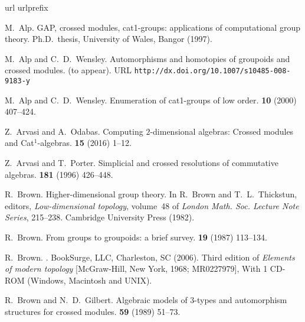 
\begin{thebibliography}{notes}

\expandafter\ifx\csname url\endcsname\relax
  \def\url#1{{\tt #1}}\fi
\expandafter\ifx\csname urlprefix\endcsname\relax\def\urlprefix{URL }\fi

M.~Alp.
\newblock GAP, crossed modules, cat1-groups: applications of computational
  group theory.
\newblock Ph.{D}.~thesis, University of Wales, Bangor (1997).

M.~Alp and C.~D.~Wensley.
\newblock Automorphisms and homotopies of groupoids and crossed modules.
 (to appear).
\newline\urlprefix\url{http://dx.doi.org/10.1007/s10485-008-9183-y}

M.~Alp and C.~D.~Wensley.
\newblock Enumeration of cat1-groups of low order.
 {\bf 10} (2000) 407--424.

Z.~Arvasi and A.~Odabas.
\newblock Computing $2$-dimensional algebras: 
          Crossed modules and Cat$^1$-algebras.
 {\bf 15} (2016) 1--12.

Z.~Arvasi and T.~Porter.
\newblock Simplicial and crossed resolutions of commutative algebras.
 {\bf 181} (1996) 426--448.

R.~Brown.
\newblock Higher-dimensional group theory.
\newblock In R.~Brown and T.~L.~Thickstun, editors, {\em Low-dimensional
  topology\/}, volume~48 of {\em London Math. Soc. Lecture Note Series\/},
  215--238. Cambridge University Press (1982).

R.~Brown.
\newblock From groups to groupoids: a brief survey.
 {\bf 19} (1987) 113--134.

R.~Brown.
.
\newblock BookSurge, LLC, Charleston, SC (2006).
\newblock Third edition of {\it Elements of modern topology} [McGraw-Hill, New
  York, 1968; MR0227979], With 1 CD-ROM (Windows, Macintosh and UNIX).

R.~Brown and N.~D.~Gilbert.
\newblock Algebraic models of 3-types and automorphism structures for crossed
  modules.
 {\bf 59} (1989) 51--73.


\end{thebibliography}
